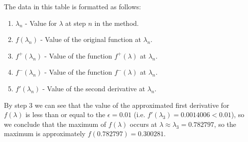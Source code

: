 \documentclass[11pt]{article}
\begin{document}
\begin{sol}
The data in this table is formatted as follows:

\begin{enumerate}
	\item $\lambda_n$ - Value for $\lambda$ at step $n$ in the method.
	\item $f(\lambda_n)$ - Value of the original function at $\lambda_n$.
	\item $f^+(\lambda_n)$ - Value of the function $f^+(\lambda)$ at $\lambda_n$.
	\item $f^-(\lambda_n)$ - Value of the function $f^-(\lambda)$ at $\lambda_n$.
	\item $f'(\lambda_n)$ - Value of the second derivative at $\lambda_n$. 
\end{enumerate}

By step $3$ we can see that the value of the approximated first derivative for $f(\lambda)$ is less than or equal to the $\epsilon = 0.01$ (i.e. $f'(\lambda_3) = 0.0014006 < 0.01$), so we conclude that the maximum of $f(\lambda)$ occurs at $\lambda \approx \lambda_{3} = 0.782797$, so the maximum is approximately $f(0.782797) = 0.300281$.

\end{sol}
\end{document}
